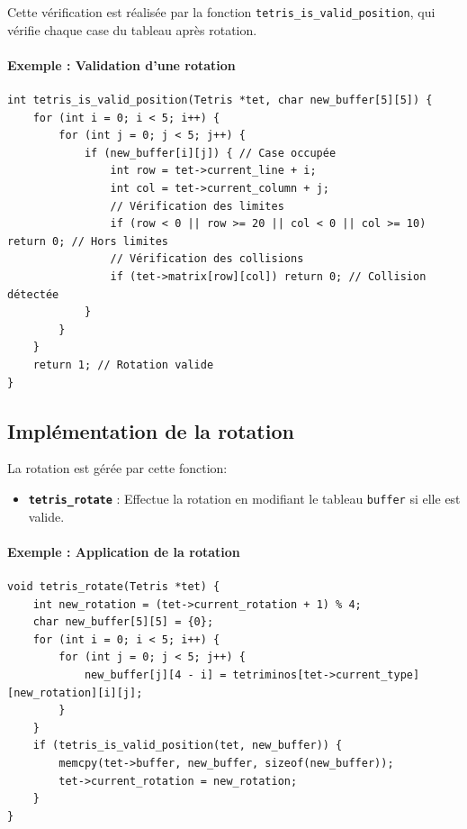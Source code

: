 \documentclass[12pt,a4paper]{report}
\begin{document}
Cette vérification est réalisée par la fonction \texttt{tetris\_is\_valid\_position}, qui vérifie chaque case du tableau après rotation.

\paragraph{Exemple : Validation d'une rotation}
\begin{lstlisting}
int tetris_is_valid_position(Tetris *tet, char new_buffer[5][5]) {
    for (int i = 0; i < 5; i++) {
        for (int j = 0; j < 5; j++) {
            if (new_buffer[i][j]) { // Case occupée
                int row = tet->current_line + i;
                int col = tet->current_column + j;
                // Vérification des limites
                if (row < 0 || row >= 20 || col < 0 || col >= 10) return 0; // Hors limites
                // Vérification des collisions
                if (tet->matrix[row][col]) return 0; // Collision détectée
            }
        }
    }
    return 1; // Rotation valide
}
\end{lstlisting}

\subsection{Implémentation de la rotation}
La rotation est gérée par cette fonction:
\begin{itemize}
    \item \textbf{\texttt{tetris\_rotate}} : Effectue la rotation en modifiant le tableau \texttt{buffer} si elle est valide.
\end{itemize}

\paragraph{Exemple : Application de la rotation}
\begin{lstlisting}
void tetris_rotate(Tetris *tet) {
    int new_rotation = (tet->current_rotation + 1) % 4;
    char new_buffer[5][5] = {0};
    for (int i = 0; i < 5; i++) {
        for (int j = 0; j < 5; j++) {
            new_buffer[j][4 - i] = tetriminos[tet->current_type][new_rotation][i][j];
        }
    }
    if (tetris_is_valid_position(tet, new_buffer)) {
        memcpy(tet->buffer, new_buffer, sizeof(new_buffer));
        tet->current_rotation = new_rotation;
    }
}
\end{lstlisting}

\newpage
\end{document}
